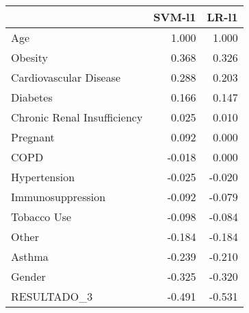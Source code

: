 \begin{tabular}{lrr}
\toprule
{} &  SVM-l1 &  LR-l1 \\
\midrule
Age                         &   1.000 &  1.000 \\
Obesity                     &   0.368 &  0.326 \\
Cardiovascular Disease      &   0.288 &  0.203 \\
Diabetes                    &   0.166 &  0.147 \\
Chronic Renal Insufficiency &   0.025 &  0.010 \\
Pregnant                    &   0.092 &  0.000 \\
COPD                        &  -0.018 &  0.000 \\
Hypertension                &  -0.025 & -0.020 \\
Immunosuppression           &  -0.092 & -0.079 \\
Tobacco Use                 &  -0.098 & -0.084 \\
Other                       &  -0.184 & -0.184 \\
Asthma                      &  -0.239 & -0.210 \\
Gender                      &  -0.325 & -0.320 \\
RESULTADO\_3                 &  -0.491 & -0.531 \\
\bottomrule
\end{tabular}
